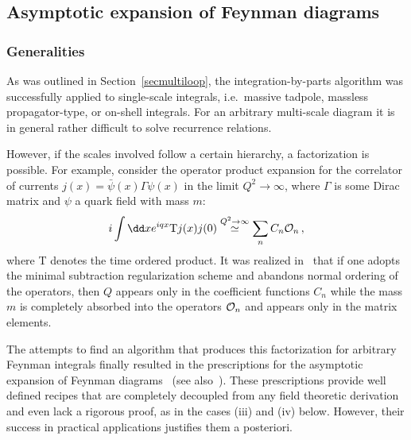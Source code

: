 \subsection{\label{subasymp}Asymptotic expansion of Feynman diagrams}

%
\subsubsection{Generalities}
As was outlined in Section~\ref{secmultiloop}, the
integration-by-parts algorithm was 
successfully applied to single-scale integrals, i.e.\ massive
tadpole, massless propagator-type, or on-shell integrals.
For an arbitrary multi-scale diagram it is in general rather difficult to
solve recurrence relations.

However, if the scales involved follow a certain hierarchy, a
factorization is possible.  For example, consider the operator product
expansion for the correlator of currents $j(x) = \bar \psi(x) \Gamma
\psi(x)$ in the limit $Q^2 \to \infty$, where $\Gamma$ is some Dirac
matrix and $\psi$ a quark field with mass $m$:
\begin{equation}
i\int \dd x e^{iqx} {\rm T} j(x) j(0) \stackrel{Q^2\to \infty}{\simeq}
\sum_n C_n {\cal O}_n\,,
\end{equation}
where T denotes the time ordered product.  It was realized
in~\cite{CheGorTka82,Tka83,BroGen84,CheSpi87} that if one adopts the
minimal subtraction regularization scheme and abandons normal ordering
of the operators, then $Q$ appears only in the coefficient functions
$C_n$ while the mass $m$ is completely absorbed into the operators
${\cal O}_n$ and appears only in the matrix elements.

The attempts to find an algorithm that produces this factorization for
arbitrary Feynman integrals finally resulted in the prescriptions for
the asymptotic expansion of Feynman
diagrams~\cite{PivTka84,GorLar87,CheSmi87,Smi91,Smi95} (see
also~\cite{Davetal}). These prescriptions provide well defined recipes
that are completely decoupled from any field theoretic derivation and
even lack a rigorous proof, as in the cases (iii) and (iv) below.
However, their success in practical applications justifies them a
posteriori.


